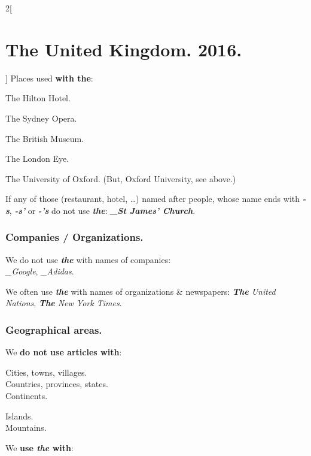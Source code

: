 \documentclass[10pt,a4paper]{article}
\newlength{\OriginalParIndent}
\newcommand\ex[1]{\textit{\textbf{{#1}}}}           %
\newcommand\za{\_\thinspace }                       %
\begin{document}
\begin{multicols}{2}[\section{The United Kingdom. 2016.}]
\vspace{2mm}
Places used \textbf{with the}:
\begin{description}[leftmargin=3.9cm,rightmargin=\OriginalParIndent,style=nextline,before={\renewcommand\makelabel[1]{##1:}}]
  \item[Hotels] The Hilton Hotel.
  \item[Theaters, cinemas, operas] The Sydney Opera.
  \item[Museums] The British Museum.
  \item[Monuments, towers] The London Eye.
  \item[Names with ``of''] The University of Oxford. (But, Oxford University, see above.)
\end{description}
\vspace{-\parskip}
If any of those (restaurant, hotel, \dots) named after people, whose name ends with \ex{-s}, \ex{-s’} or \ex{-’s} do not use \ex{the}: \ex{\za St James’ Church}.



\subsubsection{Companies / Organizations.}
We do not use \ex{the} with names of companies:\\
\textit{\za Google}, \textit{\za Adidas}.

We often use \ex{the} with names of organizations \& newspapers:
\textit{\ex{The} United Nations}, \textit{\ex{The} New York Times}.



\subsubsection{Geographical areas.}
We \textbf{do not use articles with}:

\hspace{\OriginalParIndent}\begin{minipage}{0.55\linewidth}
Cities, towns, villages.\\
Countries, provinces, states.\\
Continents.
\end{minipage}
\begin{minipage}{0.3\linewidth}
Islands.\\
Mountains.
\end{minipage}\vspace{\parskip}


We \textbf{use \ex{the} with}:


\end{multicols}
\end{document}

